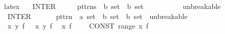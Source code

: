 \begin{isabellebody}
\isanewline
{}\isamarkupfalse%
\ {\isacharparenleft}{\kern0pt}latex\ \isanewline
\ \ {\isachardoublequoteopen}{\isacharunderscore}{\kern0pt}INTER{}{\isachardoublequoteclose}\ \ \ \ \ {\isacharcolon}{\kern0pt}{\isacharcolon}{\kern0pt}\ {\isachardoublequoteopen}pttrns\ {\isasymRightarrow}\ {\isacharprime}{\kern0pt}b\ set\ {\isasymRightarrow}\ {\isacharprime}{\kern0pt}b\ set{\isachardoublequoteclose}\ \ \ \ \ \ \ \ \ \ \ {\isacharparenleft}{\kern0pt}{\isachardoublequoteopen}{\isacharparenleft}{\kern0pt}{}{\isasymInter}{\isacharparenleft}{\kern0pt}{\isasymopen}unbreakable{\isasymclose}\isactrlbsub {\isacharunderscore}{\kern0pt}\isactrlesub {\isacharparenright}{\kern0pt}{\isacharslash}{\kern0pt}\ {\isacharunderscore}{\kern0pt}{\isacharparenright}{\kern0pt}{\isachardoublequoteclose}\ {\isacharbrackleft}{\kern0pt}{}{\isacharcomma}{\kern0pt}\ {}{}{\isacharbrackright}{\kern0pt}\ {}{}{\isacharparenright}{\kern0pt}\isanewline
\ \ {\isachardoublequoteopen}{\isacharunderscore}{\kern0pt}INTER{\isachardoublequoteclose}\ \ \ \ \ \ {\isacharcolon}{\kern0pt}{\isacharcolon}{\kern0pt}\ {\isachardoublequoteopen}pttrn\ {\isasymRightarrow}\ {\isacharprime}{\kern0pt}a\ set\ {\isasymRightarrow}\ {\isacharprime}{\kern0pt}b\ set\ {\isasymRightarrow}\ {\isacharprime}{\kern0pt}b\ set{\isachardoublequoteclose}\ \ {\isacharparenleft}{\kern0pt}{\isachardoublequoteopen}{\isacharparenleft}{\kern0pt}{}{\isasymInter}{\isacharparenleft}{\kern0pt}{\isasymopen}unbreakable{\isasymclose}\isactrlbsub {\isacharunderscore}{\kern0pt}{\isasymin}{\isacharunderscore}{\kern0pt}\isactrlesub {\isacharparenright}{\kern0pt}{\isacharslash}{\kern0pt}\ {\isacharunderscore}{\kern0pt}{\isacharparenright}{\kern0pt}{\isachardoublequoteclose}\ {\isacharbrackleft}{\kern0pt}{}{\isacharcomma}{\kern0pt}\ {}{\isacharcomma}{\kern0pt}\ {}{}{\isacharbrackright}{\kern0pt}\ {}{}{\isacharparenright}{\kern0pt}\isanewline
\isanewline
{}\isamarkupfalse%
\isanewline
\ \ {\isachardoublequoteopen}{\isasymInter}x\ y{\isachardot}{\kern0pt}\ f{\isachardoublequoteclose}\ \ {\isasymrightleftharpoons}\ {\isachardoublequoteopen}{\isasymInter}x{\isachardot}{\kern0pt}\ {\isasymInter}y{\isachardot}{\kern0pt}\ f{\isachardoublequoteclose}\isanewline
\ \ {\isachardoublequoteopen}{\isasymInter}x{\isachardot}{\kern0pt}\ f{\isachardoublequoteclose}\ \ \ \ {\isasymrightleftharpoons}\ {\isachardoublequoteopen}{\isasymInter}{\isacharparenleft}{\kern0pt}CONST\ range\ {\isacharparenleft}{\kern0pt}{\isasymlambda}x{\isachardot}{\kern0pt}\ f{\isacharparenright}{\kern0pt}{\isacharparenright}{\kern0pt}{\isachardoublequoteclose}\isanewline

\end{isabellebody}
